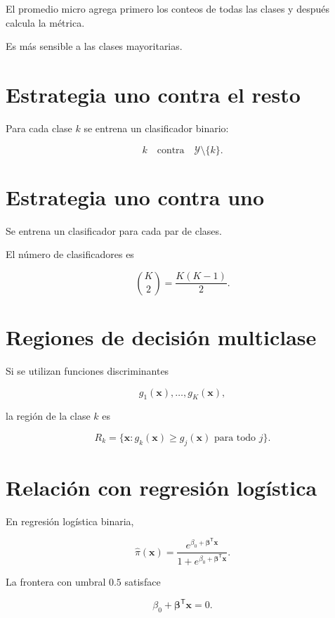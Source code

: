 \documentclass[
  spanish,
  11pt,
  letterpaper,
  DIV=11,
  numbers=noendperiod]{scrreprt}
\theoremstyle{definition}
\theoremstyle{plain}
\theoremstyle{definition}
\theoremstyle{remark}
\begin{document}
El promedio micro agrega primero los conteos de todas las clases y
después calcula la métrica.

Es más sensible a las clases mayoritarias.

\section{Estrategia uno contra el
resto}\label{estrategia-uno-contra-el-resto}

Para cada clase \(k\) se entrena un clasificador binario:

\[
k
\quad
\text{contra}
\quad
\mathcal{Y}\setminus\{k\}.
\]

\section{Estrategia uno contra uno}\label{estrategia-uno-contra-uno}

Se entrena un clasificador para cada par de clases.

El número de clasificadores es

\[
\binom{K}{2}
=
\frac{K(K-1)}{2}.
\]

\section{Regiones de decisión
multiclase}\label{regiones-de-decisiuxf3n-multiclase}

Si se utilizan funciones discriminantes

\[
g_1(\mathbf{x}),\ldots,g_K(\mathbf{x}),
\]

la región de la clase \(k\) es

\[
R_k
=
\{
\mathbf{x}
:
g_k(\mathbf{x})
\geq
g_j(\mathbf{x})
\text{ para todo }j
\}.
\]

\section{Relación con regresión
logística}\label{relaciuxf3n-con-regresiuxf3n-loguxedstica-3}

En regresión logística binaria,

\[
\widehat{\pi}(\mathbf{x})
=
\frac{
e^{\beta_0+\boldsymbol{\beta}^{\mathsf T}\mathbf{x}}
}{
1+
e^{\beta_0+\boldsymbol{\beta}^{\mathsf T}\mathbf{x}}
}.
\]

La frontera con umbral \(0.5\) satisface

\[
\beta_0
+
\boldsymbol{\beta}^{\mathsf T}\mathbf{x}
=
0.
\]
\end{document}

